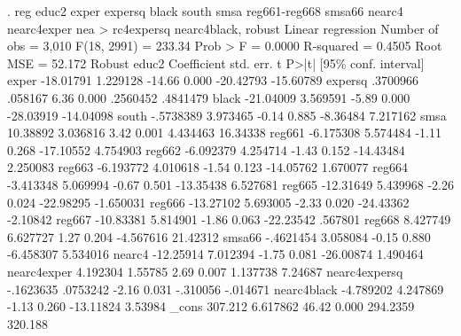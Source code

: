 . reg educ2 exper expersq black south smsa reg661-reg668 smsa66 nearc4 nearc4exper nea
> rc4expersq nearc4black, robust
{\smallskip}
Linear regression                               Number of obs     =      3,010
                                                F(18, 2991)       =     233.34
                                                Prob > F          =     0.0000
                                                R-squared         =     0.4505
                                                Root MSE          =     52.172
{\smallskip}
              {\VBAR}               Robust
        educ2 {\VBAR} Coefficient  std. err.      t    P>|t|     [95\% conf. interval]
        exper {\VBAR}  -18.01791   1.229128   -14.66   0.000    -20.42793   -15.60789
      expersq {\VBAR}   .3700966    .058167     6.36   0.000     .2560452    .4841479
        black {\VBAR}  -21.04009   3.569591    -5.89   0.000    -28.03919   -14.04098
        south {\VBAR}  -.5738389   3.973465    -0.14   0.885     -8.36484    7.217162
         smsa {\VBAR}   10.38892   3.036816     3.42   0.001     4.434463    16.34338
       reg661 {\VBAR}  -6.175308   5.574484    -1.11   0.268    -17.10552    4.754903
       reg662 {\VBAR}  -6.092379   4.254714    -1.43   0.152    -14.43484    2.250083
       reg663 {\VBAR}  -6.193772   4.010618    -1.54   0.123    -14.05762    1.670077
       reg664 {\VBAR}  -3.413348   5.069994    -0.67   0.501    -13.35438    6.527681
       reg665 {\VBAR}  -12.31649   5.439968    -2.26   0.024    -22.98295   -1.650031
       reg666 {\VBAR}  -13.27102   5.693005    -2.33   0.020    -24.43362    -2.10842
       reg667 {\VBAR}  -10.83381   5.814901    -1.86   0.063    -22.23542     .567801
       reg668 {\VBAR}   8.427749   6.627727     1.27   0.204    -4.567616    21.42312
       smsa66 {\VBAR}  -.4621454   3.058084    -0.15   0.880    -6.458307    5.534016
       nearc4 {\VBAR}  -12.25914   7.012394    -1.75   0.081    -26.00874    1.490464
  nearc4exper {\VBAR}   4.192304    1.55785     2.69   0.007     1.137738     7.24687
nearc4expersq {\VBAR}  -.1623635   .0753242    -2.16   0.031     -.310056    -.014671
  nearc4black {\VBAR}  -4.789202   4.247869    -1.13   0.260    -13.11824     3.53984
        _cons {\VBAR}    307.212   6.617862    46.42   0.000     294.2359     320.188
{\smallskip}
